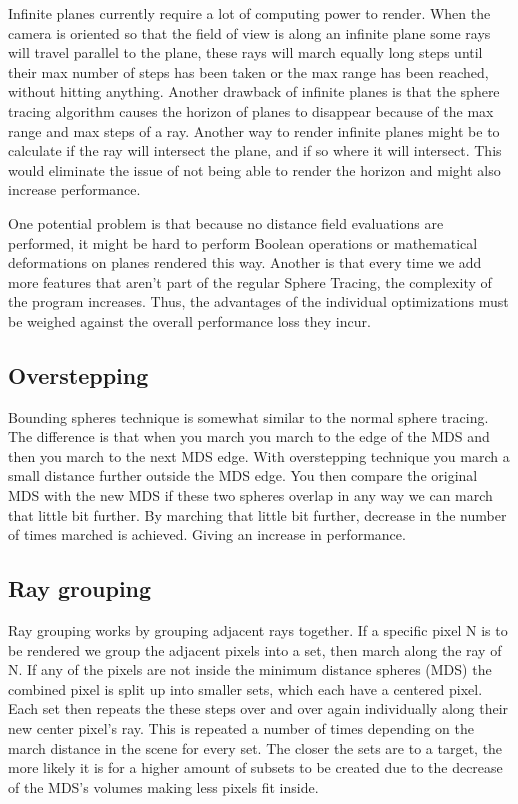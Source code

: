			Infinite planes currently require a lot of computing power to
			render. When the camera is oriented so that the field of view is
			along an infinite plane some rays will travel parallel to the
			plane, these rays will march equally long steps until their max
			number of steps has been taken or the max range has been reached,
			without hitting anything. Another drawback of infinite planes is
			that the sphere tracing algorithm causes the horizon of planes to
			disappear because of the max range and max steps of a ray. Another
			way to render infinite planes might be to calculate if the ray will
			intersect the plane, and if so where it will intersect. This would
			eliminate the issue of not being able to render the horizon and
			might also increase performance.

			One potential problem is that because no distance field evaluations 
			are performed, it might be hard to perform Boolean operations or 
			mathematical deformations on planes rendered this way. Another is 
			that every time we add more features that aren't part of the regular 
			Sphere Tracing, the complexity of the program increases. Thus, the 
			advantages of the individual optimizations must be weighed against 
			the overall performance loss they incur. 

		\subsection{Overstepping}

			Bounding spheres technique is somewhat similar to the normal sphere
			tracing. The difference is that when you march you march to the
			edge of the MDS and then you march to the next MDS edge. With
			overstepping technique you march a small distance further
			outside the MDS edge. You then compare the original MDS with the
			new MDS if these two spheres overlap in any way we can march that
			little bit further. By marching that little bit further, decrease
			in the number of times marched is achieved. Giving an increase in
			performance. 
			
		\subsection{Ray grouping}
		
			Ray grouping works by grouping adjacent rays together.  If a specific
			pixel N is to be rendered we group the adjacent pixels into a set, then
			march along the ray of N. If any of the pixels are not inside the minimum
			distance spheres (MDS) the combined pixel is split up into smaller sets,
			which each have a centered pixel. Each set then repeats the these steps
			over and over again individually along their new center pixel's ray.
			This is repeated a number of times depending on the march distance in the
			scene for every set. The closer the sets are to a target, the more likely
			it is for a higher amount of subsets to be created due to the decrease of
			the MDS's volumes making less pixels fit inside.
			
